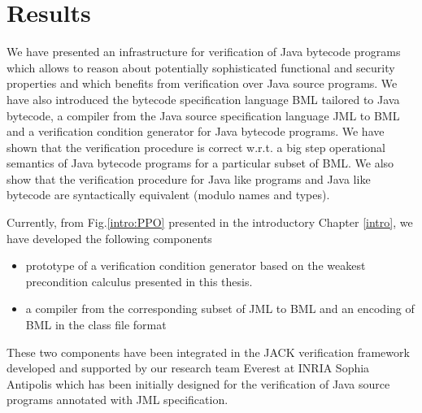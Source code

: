 
\section{Results}
We have  presented an infrastructure for verification of Java bytecode programs   which allows to reason about potentially
sophisticated  functional and security properties and
which benefits from verification over Java source programs. We have also 
introduced the bytecode specification language BML tailored to Java bytecode, a compiler
from the Java source specification language JML to BML and a verification 
condition generator for Java bytecode programs. 
We have shown that the verification procedure is correct w.r.t. a big step  operational semantics of Java bytecode programs
for a particular subset of BML. We also show that the verification procedure for Java like programs
and Java like bytecode are syntactically equivalent (modulo names and types). 

Currently, from Fig.\ref{intro:PPO} presented in the introductory Chapter \ref{intro}, we have
developed the following components 
\begin{itemize}
         \item prototype of a verification condition generator based on the weakest precondition calculus presented in this thesis. 
	 \item a compiler from the corresponding subset of JML to BML  
	  and an encoding of BML in the class file format 
\end{itemize}
These two components have been integrated in the JACK \cite{BRL-JACK} verification framework 
developed and supported by our research team Everest at INRIA Sophia Antipolis which has been initially designed for
 the verification of Java source programs annotated with JML specification.

 

